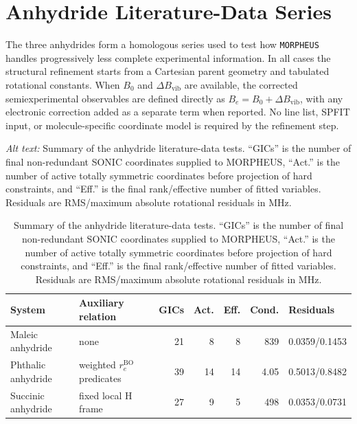 \documentclass[12pt]{article}
\begin{document}
\section{Anhydride Literature-Data Series}

The three anhydrides form a homologous series used to test how
\texttt{MORPHEUS} handles progressively less complete experimental
information. In all cases the structural refinement starts from a Cartesian
parent geometry and tabulated rotational constants. When $B_0$ and
$\Delta B_\mathrm{vib}$ are available, the corrected semiexperimental
observables are defined directly as $B_e=B_0+\Delta B_\mathrm{vib}$, with any
electronic correction added as a separate term when reported. No line list,
SPFIT input, or molecule-specific coordinate model is required by the
refinement step.

\begin{table}
\caption{Summary of the anhydride literature-data tests. ``GICs'' is the
number of final non-redundant SONIC coordinates supplied to MORPHEUS,
``Act.'' is
the number of active totally symmetric coordinates before projection of hard
constraints, and ``Eff.'' is the final rank/effective number of fitted
variables. Residuals are RMS/maximum absolute rotational residuals in MHz.}
\label{tab:si-anhydride-series}
\par\smallskip\noindent\textit{Alt text:} Summary of the anhydride literature-data tests. ``GICs'' is the number of final non-redundant SONIC coordinates supplied to MORPHEUS, ``Act.'' is the number of active totally symmetric coordinates before projection of hard constraints, and ``Eff.'' is the final rank/effective number of fitted variables. Residuals are RMS/maximum absolute rotational residuals in MHz.
\scriptsize
\setlength{\tabcolsep}{3pt}
\begin{tabular}{llrrrrl}
\toprule
System & Auxiliary relation & GICs & Act. & Eff. & Cond. & Residuals \\
\midrule
Maleic anhydride & none & 21 & 8 & 8 & 839 & 0.0359/0.1453 \\
Phthalic anhydride & weighted $r_e^\mathrm{BO}$ predicates & 39 & 14 & 14 & 4.05 & 0.5013/0.8482 \\
Succinic anhydride & fixed local H frame & 27 & 9 & 5 & 498 & 0.0353/0.0731 \\
\bottomrule
\end{tabular}
\end{table}
\end{document}
